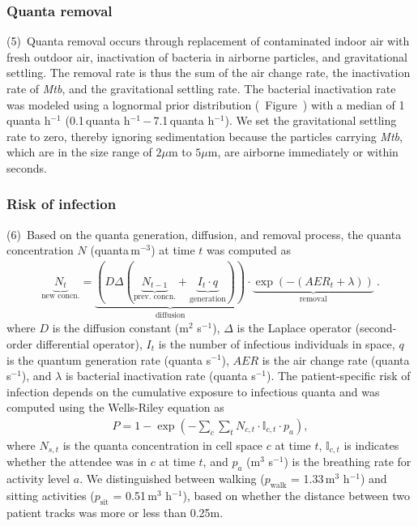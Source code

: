 \documentclass[fleqn,11pt]{wlscirep}
\begin{document}
\subsubsection*{Quanta removal}

(5)~Quanta removal occurs through replacement of contaminated indoor air with fresh outdoor air, inactivation of bacteria in airborne particles, and gravitational settling. The removal rate is thus the sum of the air change rate, the inactivation rate of \emph{Mtb}, and the gravitational settling rate. The bacterial inactivation rate was modeled using a lognormal prior distribution (\supp~Figure~\zref{}) with a median of 1\,quanta h$^{-1}$ (0.1\,quanta h$^{-1}$\,$-$\,7.1\,quanta h$^{-1}$)\cite{Loudon1969AMRRD,Lever2000LettersAppliedMicrobio,Gannon2007ResVetSci,Klein2014IJMyco}. We set the gravitational settling rate to zero, thereby ignoring sedimentation because the particles carrying \emph{Mtb}, which are in the size range of $2\mu$m to $5\mu$m\cite{Fennelly2020Lancet}, are airborne immediately or within seconds\cite{Vuorinen2020SafSci}.

\subsubsection*{Risk of infection}

(6)~Based on the quanta generation, diffusion, and removal process, the quanta concentration $N$ (quanta\,m$^{-3}$) at time $t$ was computed as 
\begin{align}\label{eq:spattemp-N}
    \underbrace{N_{t}}_{\text{new concn.}} = \underbrace{\left(D \Delta (\underbrace{N_{t-1}}_{\text{prev. concn.}} + \underbrace{I_t \cdot q}_{\text{generation}})\right)}_{\text{diffusion}} \cdot \underbrace{\exp\left(-(AER_t + \lambda)\right)}_{\text{removal}} ~.
\end{align}
where $D$ is the diffusion constant (m$^2$ s$^{-1}$), $\Delta$ is the Laplace operator (second-order differential operator), $I_t$ is the number of infectious individuals in space, $q$ is the quantum generation rate (quanta s$^{-1}$), $AER$ is the air change rate (quanta\,s$^{-1}$), and $\lambda$ is bacterial inactivation rate (quanta s$^{-1}$). The patient-specific risk of infection depends on the cumulative exposure to infectious quanta and was computed using the Wells-Riley equation as
\begin{align}
    P = 1-\exp\left(-\sum_c \sum_t N_{c,t} \cdot \mathbb{I}_{c,t} \cdot p_a\right),
\end{align}
where $N_{s,t}$ is the quanta concentration in cell space $c$ at time $t$, $\mathbb{I}_{c,t}$ is indicates whether the attendee was in $c$ at time $t$, and $p_a$ (m$^3$ s$^{-1}$) is the breathing rate for activity level $a$. We distinguished between walking ($p_\mathrm{walk}$ = 1.33\,m$^3$ h$^{-1}$) and sitting activities ($p_\mathrm{sit}$ = 0.51\,m$^3$ h$^{-1}$)\cite{Adams1993}, based on whether the distance between two patient tracks was more or less than 0.25m.
\end{document}
